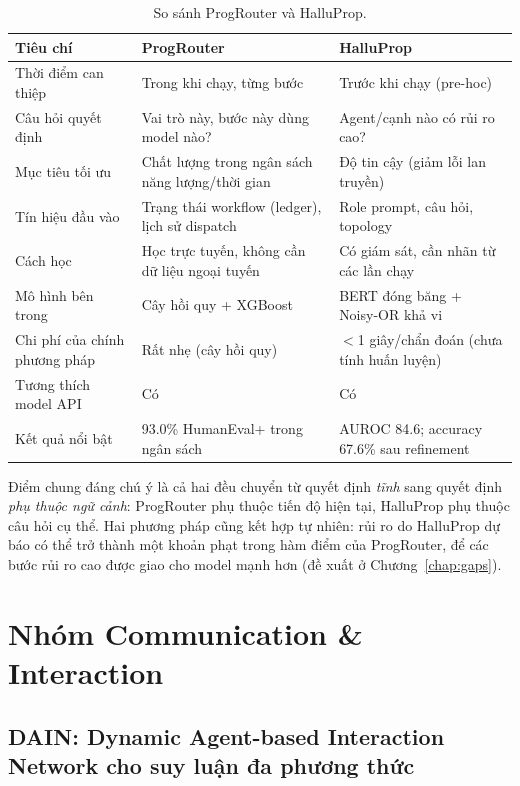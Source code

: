 \begin{table}[!htbp]
\centering
\small
\caption{So sánh ProgRouter và HalluProp.}
\label{tab:cmp-g2}
\begin{tabularx}{\textwidth}{L{3.0cm} Y Y}
\toprule
\textbf{Tiêu chí} & \textbf{ProgRouter} & \textbf{HalluProp} \\
\midrule
Thời điểm can thiệp & Trong khi chạy, từng bước & Trước khi chạy (pre-hoc) \\
Câu hỏi quyết định & Vai trò này, bước này dùng model nào? & Agent/cạnh nào có rủi ro cao? \\
Mục tiêu tối ưu & Chất lượng trong ngân sách năng lượng/thời gian & Độ tin cậy (giảm lỗi lan truyền) \\
Tín hiệu đầu vào & Trạng thái workflow (ledger), lịch sử dispatch & Role prompt, câu hỏi, topology \\
Cách học & Học trực tuyến, không cần dữ liệu ngoại tuyến & Có giám sát, cần nhãn từ các lần chạy \\
Mô hình bên trong & Cây hồi quy + XGBoost & BERT đóng băng + Noisy-OR khả vi \\
Chi phí của chính phương pháp & Rất nhẹ (cây hồi quy) & $<$1 giây/chẩn đoán (chưa tính huấn luyện) \\
Tương thích model API & Có & Có \\
Kết quả nổi bật & 93.0\% HumanEval+ trong ngân sách & AUROC 84.6; accuracy 67.6\% sau refinement \\
\bottomrule
\end{tabularx}
\end{table}

Điểm chung đáng chú ý là cả hai đều chuyển từ quyết định \emph{tĩnh} sang quyết định \emph{phụ thuộc ngữ cảnh}: ProgRouter phụ thuộc tiến độ hiện tại, HalluProp phụ thuộc câu hỏi cụ thể. Hai phương pháp cũng kết hợp tự nhiên: rủi ro do HalluProp dự báo có thể trở thành một khoản phạt trong hàm điểm của ProgRouter, để các bước rủi ro cao được giao cho model mạnh hơn (đề xuất ở Chương~\ref{chap:gaps}).

\section{Nhóm Communication \& Interaction}

\subsection{DAIN: Dynamic Agent-based Interaction Network cho suy luận đa phương thức}
\label{sec:dain}

